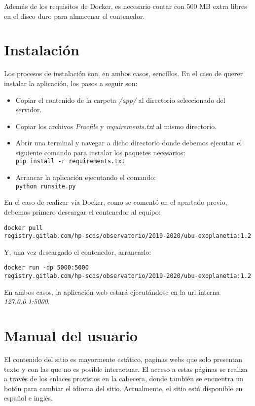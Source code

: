 Además de los requisitos de Docker, es necesario contar con 500 MB extra libres en el disco duro para almacenar el contenedor.

\section{Instalación}

Los procesos de instalación son, en ambos casos, sencillos. En el caso de querer instalar la aplicación, los pasos a seguir son:

\begin{itemize}
    \item Copiar el contenido de la carpeta \textit{/app/} al directorio seleccionado del servidor.
    \item Copiar los archivos \textit{Procfile} y \textit{requirements.txt} al mismo directorio.
    \item Abrir una terminal y navegar a dicho directorio donde debemos ejecutar el siguiente comando para instalar los paquetes necesarios:\\
    \texttt{pip install -r requirements.txt}
    \item Arrancar la aplicación ejecutando el comando:\\
    \texttt{python runsite.py}
\end{itemize}

En el caso de realizar vía Docker, como se comentó en el apartado previo, debemos primero descargar el contenedor al equipo:

\texttt{docker pull \\ registry.gitlab.com/hp-scds/observatorio/2019-2020/ubu-exoplanetia:1.2}

Y, una vez descargado el contenedor, arrancarlo:

\texttt{docker run -dp 5000:5000 \\ registry.gitlab.com/hp-scds/observatorio/2019-2020/ubu-exoplanetia:1.2}

En ambos casos, la aplicación web estará ejecutándose en la url interna \textit{127.0.0.1:5000}.

\section{Manual del usuario}

El contenido del sitio es mayormente estático, paginas webs que solo presentan texto y con las que no es posible interactuar. El acceso a estas páginas se realiza a través de los enlaces provistos en la cabecera, donde también se encuentra un botón para cambiar el idioma del sitio. Actualmente, el sitio está disponible en español e inglés.

